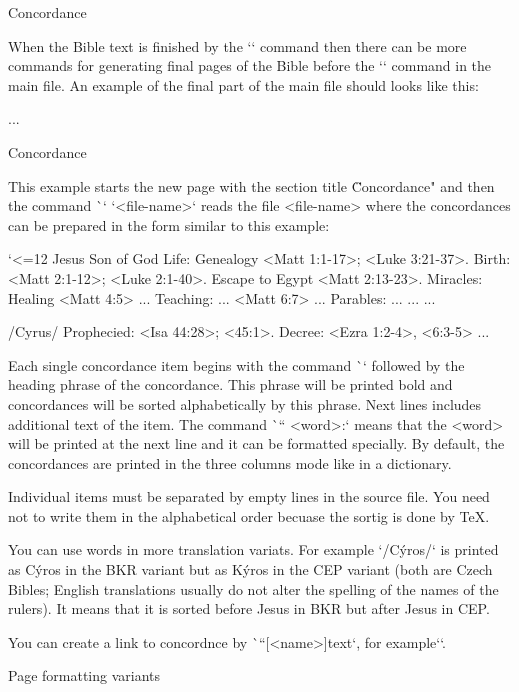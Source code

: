 {{\sec Concordance

When the Bible text is finished by the `\processbooks` command then there
can be more commands for generating final pages of the Bible before the `\bye`
command in the main file. An example of the final part of the main file
should looks like this:

\begtt
...
\processbooks %
\vfil\supereject  %

\nonum\sec Concordance
\bye  %
\endtt

This example starts the new page with the section title \"Concordance" and
then the command \`\concordance` `{<file-name>}` reads the file <file-name>
where the concordances can be prepared in the form similar to this example:

\begtt \catcode`<=12
\ccd Jesus
Son of God
\+ Life: Genealogy  <Matt 1:1-17>; <Luke 3:21-37>.
   Birth:  <Matt 2:1-12>; <Luke 2:1-40>.
   Escape to Egypt   <Matt 2:13-23>.
\+ Miracles: Healing <Matt 4:5> ...
\+ Teaching: ... <Matt 6:7> ...
\+ Parables: ... ... ...

\ccd \x/Cyrus/
\+ Prophecied: <Isa 44:28>; <45:1>.
\+ Decree:  <Ezra 1:2-4>, <6:3-5> ...
\endtt

Each single concordance item begins with the command \`\ccd` followed by the
heading phrase of the concordance. This phrase will be printed bold and
concordances will be sorted alphabetically by this phrase. Next lines
includes additional text of the item. The command
\`\+`` <word>:` means that the <word> will be printed at the next line and it
can be formatted specially. By default, the concordances are printed in the
three columns mode like in a dictionary.

Individual items must be separated by empty lines in the source file. You need not
to write them in the alphabetical order becuase the sortig is done by
\TeX.

You can use words in more translation variats. For example `\x/Cýros/`
is printed as Cýros in the BKR variant but as Kýros in the CEP variant
(both are Czech Bibles; English translations usually do not alter the spelling of the names of the rulers).
It means that it is sorted before Jesus in BKR but after Jesus in CEP.

You can create a link to concordnce by \`\ccdlink``[<name>]{text}`,
for example\nl ``.

\sec Page formatting variants

}}

